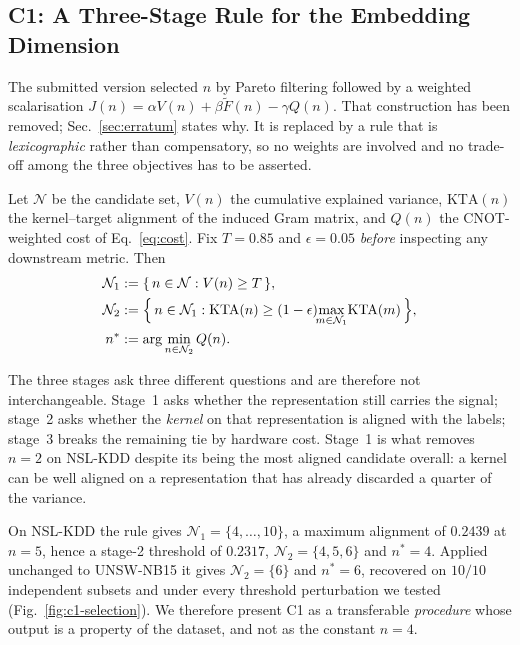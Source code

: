 \subsection{C1: A Three-Stage Rule for the Embedding Dimension}



The submitted version selected $n$ by Pareto filtering followed by a weighted
scalarisation $J(n) = \alpha V(n) + \beta\widetilde{F}(n) - \gamma Q(n)$. That
construction has been removed; Sec.~\ref{sec:erratum} states why. It is replaced
by a rule that is \emph{lexicographic} rather than compensatory, so no weights
are involved and no trade-off among the three objectives has to be asserted.

\begin{definition}
\label{def:three-stage}
Let $\mathcal{N}$ be the candidate set, $V(n)$ the cumulative explained variance,
$\mathrm{KTA}(n)$ the kernel--target alignment of the induced Gram matrix, and
$Q(n)$ the CNOT-weighted cost of Eq.~\eqref{eq:cost}. Fix $T=0.85$ and $\epsilon=0.05$
\emph{before} inspecting any downstream metric. Then
\begin{align}
  \mathcal{N}_1 &:= \{\, n \in \mathcal{N} : V(n) \ge T \,\}, \\
  \mathcal{N}_2 &:= \Bigl\{\, n \in \mathcal{N}_1 : \mathrm{KTA}(n) \ge
                   (1-\epsilon)\!\!\max_{m\in\mathcal{N}_1}\!\mathrm{KTA}(m)
                   \,\Bigr\}, \\
  n^{\ast}      &:= \arg\min_{n \in \mathcal{N}_2} Q(n).
\end{align}
\end{definition}

The three stages ask three different questions and are therefore not
interchangeable. Stage~1 asks whether the representation still carries the
signal; stage~2 asks whether the \emph{kernel} on that representation is aligned
with the labels; stage~3 breaks the remaining tie by hardware cost. Stage~1 is
what removes $n=2$ on NSL-KDD despite its being the most aligned candidate
overall: a kernel can be well aligned on a representation that has already
discarded a quarter of the variance.

On NSL-KDD the rule gives $\mathcal{N}_1=\{4,\dots,10\}$, a maximum alignment of
$0.2439$ at $n=5$, hence a stage-2 threshold of $0.2317$, $\mathcal{N}_2=\{4,5,6\}$
and $n^{\ast}=4$. Applied unchanged to UNSW-NB15 it gives $\mathcal{N}_2=\{6\}$
and $n^{\ast}=6$, recovered on $10/10$ independent subsets and under every
threshold perturbation we tested (Fig.~\ref{fig:c1-selection}). We therefore
present C1 as a transferable \emph{procedure} whose output is a property of the
dataset, and not as the constant $n=4$.

